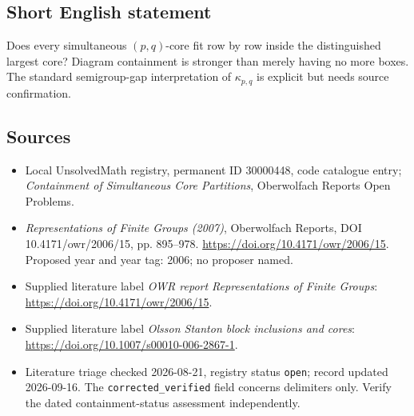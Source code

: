 \documentclass[11pt]{article}
\begin{document}
\subsection{Short English statement}
Does every simultaneous \((p,q)\)-core fit row by row inside the distinguished largest core? Diagram containment is stronger than merely having no more boxes. The standard semigroup-gap interpretation of \(\kappa_{p,q}\) is explicit but needs source confirmation.
\subsection{Sources}
\begin{itemize}\item Local UnsolvedMath registry, permanent ID 30000448, code catalogue entry; \emph{Containment of Simultaneous Core Partitions}, Oberwolfach Reports Open Problems.\item \emph{Representations of Finite Groups (2007)}, Oberwolfach Reports, DOI 10.4171/owr/2006/15, pp. 895--978. \url{https://doi.org/10.4171/owr/2006/15}. Proposed year and year tag: 2006; no proposer named.\item Supplied literature label \emph{OWR report Representations of Finite Groups}: \url{https://doi.org/10.4171/owr/2006/15}.\item Supplied literature label \emph{Olsson Stanton block inclusions and cores}: \url{https://doi.org/10.1007/s00010-006-2867-1}.\item Literature triage checked 2026-08-21, registry status \texttt{open}; record updated 2026-09-16. The \texttt{corrected\_verified} field concerns delimiters only. Verify the dated containment-status assessment independently.\end{itemize}
\end{document}
